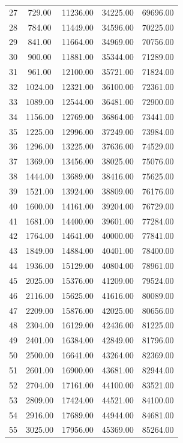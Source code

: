 \documentclass{amsart}
\begin{document}
\begin{center}
\begin{longtable}{|c|c|c|c|c|}
  27 & 729.00 & 11236.00 & 34225.00 & 69696.00 \\
  28 & 784.00 & 11449.00 & 34596.00 & 70225.00 \\
  29 & 841.00 & 11664.00 & 34969.00 & 70756.00 \\
  30 & 900.00 & 11881.00 & 35344.00 & 71289.00 \\
  31 & 961.00 & 12100.00 & 35721.00 & 71824.00 \\
  32 & 1024.00 & 12321.00 & 36100.00 & 72361.00 \\
  33 & 1089.00 & 12544.00 & 36481.00 & 72900.00 \\
  34 & 1156.00 & 12769.00 & 36864.00 & 73441.00 \\
  35 & 1225.00 & 12996.00 & 37249.00 & 73984.00 \\
  36 & 1296.00 & 13225.00 & 37636.00 & 74529.00 \\
  37 & 1369.00 & 13456.00 & 38025.00 & 75076.00 \\
  38 & 1444.00 & 13689.00 & 38416.00 & 75625.00 \\
  39 & 1521.00 & 13924.00 & 38809.00 & 76176.00 \\
  40 & 1600.00 & 14161.00 & 39204.00 & 76729.00 \\
  41 & 1681.00 & 14400.00 & 39601.00 & 77284.00 \\
  42 & 1764.00 & 14641.00 & 40000.00 & 77841.00 \\
  43 & 1849.00 & 14884.00 & 40401.00 & 78400.00 \\
  44 & 1936.00 & 15129.00 & 40804.00 & 78961.00 \\
  45 & 2025.00 & 15376.00 & 41209.00 & 79524.00 \\
  46 & 2116.00 & 15625.00 & 41616.00 & 80089.00 \\
  47 & 2209.00 & 15876.00 & 42025.00 & 80656.00 \\
  48 & 2304.00 & 16129.00 & 42436.00 & 81225.00 \\
  49 & 2401.00 & 16384.00 & 42849.00 & 81796.00 \\
  50 & 2500.00 & 16641.00 & 43264.00 & 82369.00 \\
  51 & 2601.00 & 16900.00 & 43681.00 & 82944.00 \\
  52 & 2704.00 & 17161.00 & 44100.00 & 83521.00 \\
  53 & 2809.00 & 17424.00 & 44521.00 & 84100.00 \\
  54 & 2916.00 & 17689.00 & 44944.00 & 84681.00 \\
  55 & 3025.00 & 17956.00 & 45369.00 & 85264.00 \\

\end{longtable}
\end{center}
\end{document}
